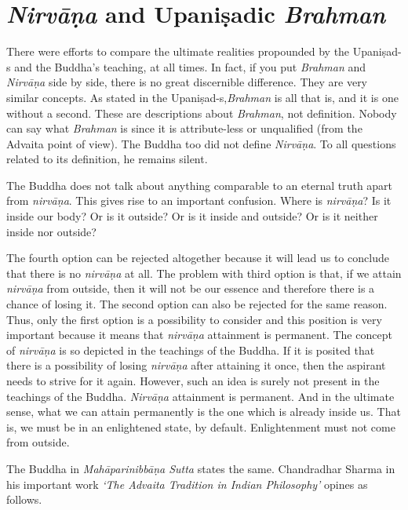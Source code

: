 \vspace{-.3cm}

\section*{\textit{Nirvāṇa} and Upaniṣadic \textit{Brahman}}

There were efforts to compare the ultimate realities propounded by the Upaniṣad-s and the Buddha’s teaching, at all times. In fact, if you put \textit{Brahman} and \textit{Nirvāṇa} side by side, there is no great discernible difference. They are very similar concepts. As stated in the Upaniṣad-s,\break \textit{Brahman} is all that is, and it is one without a second. These are descriptions about \textit{Brahman}, not definition. Nobody can say what \textit{Brahman} is since it is attribute-less or unqualified (from the Advaita point of view). The Buddha too did not define \textit{Nirvāṇa}. To all questions related to its definition, he remains silent.

The Buddha does not talk about anything comparable to an eternal truth apart from \textit{nirvāṇa}. This gives rise to an important confusion. Where is \textit{nirvāṇa}? Is it inside our body? Or is it outside? Or is it inside and outside? Or is it neither inside nor outside?

The fourth option can be rejected altogether because it will lead us to conclude that there is no \textit{nirvāṇa} at all. The problem with third option is that, if we attain \textit{nirvāṇa} from outside, then it will not be our essence and therefore there is a chance of losing it. The second option can also be rejected for the same reason. Thus, only the first option is a possibility to consider and this position is very important because it means that \textit{nirvāṇa} attainment is permanent. The concept of \textit{nirvāṇa} is so depicted in the teachings of the Buddha. If it is posited that there is a possibility of losing \textit{nirvāṇa} after attaining it once, then the aspirant needs to strive for it again. However, such an idea is surely not present in the teachings of the Buddha. \textit{Nirvāṇa} attainment is permanent. And in the ultimate sense, what we can attain permanently is the one which is already inside us. That is, we must be in an enlightened state, by default. Enlightenment must not come from outside.

The Buddha in \textit{Mahāparinibbāṇa Sutta} states the same. Chandradhar Sharma in his important work \textit{‘The Advaita Tradition in Indian Philosophy’} opines as follows.

